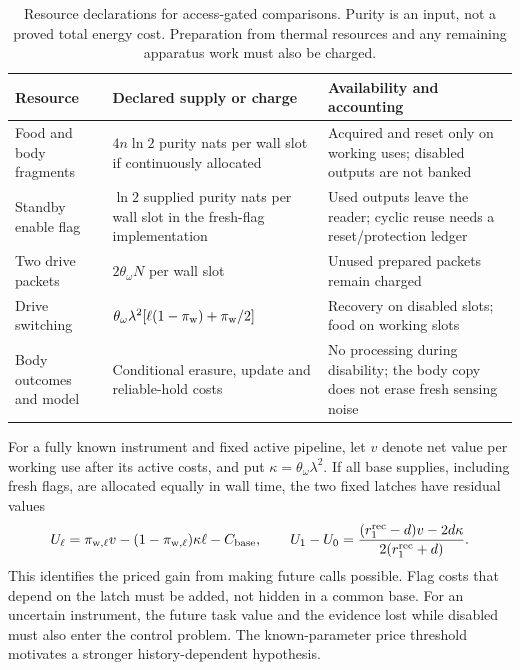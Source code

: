 \documentclass[12pt]{article}
\theoremstyle{definition}
\begin{document}
\begin{table}[ht]
\centering\small
\begin{tabular}{@{}P{3.2cm}P{4.6cm}P{4.7cm}@{}}
\toprule
Resource & Declared supply or charge & Availability and accounting\\
\midrule
Food and body fragments & $4n\ln2$ purity nats per wall slot if continuously allocated & Acquired and reset only on working uses; disabled outputs are not banked\\[3pt]
Standby enable flag & $\ln2$ supplied purity nats per wall slot in the fresh-flag implementation & Used outputs leave the reader; cyclic reuse needs a reset/protection ledger\\[3pt]
Two drive packets & $2\theta_\omega N$ per wall slot & Unused prepared packets remain charged\\[3pt]
Drive switching & $\theta_\omega\lambda^2[\ell(1-\pi_{\rm w})+\pi_{\rm w}/2]$ & Recovery on disabled slots; food on working slots\\[3pt]
Body outcomes and model & Conditional erasure, update and reliable-hold costs & No processing during disability; the body copy does not erase fresh sensing noise\\
\bottomrule
\end{tabular}
\caption{Resource declarations for access-gated comparisons. Purity is an input, not a proved total energy cost. Preparation from thermal resources and any remaining apparatus work must also be charged.}
\label{tab:body_access_ledger}
\end{table}

For a fully known instrument and fixed active pipeline, let $v$ denote net value per working use after its active costs, and put $\kappa=\theta_\omega\lambda^2$. If all base supplies, including fresh flags, are allocated equally in wall time, the two fixed latches have residual values
\[
 U_\ell=\pi_{{\rm w},\ell}v-(1-\pi_{{\rm w},\ell})\kappa\ell-C_{\rm base},
 \qquad U_1-U_0=\frac{(r_1^{\rm rec}-d)v-2d\kappa}{2(r_1^{\rm rec}+d)}.
\]
This identifies the priced gain from making future calls possible. Flag costs that depend on the latch must be added, not hidden in a common base. For an uncertain instrument, the future task value and the evidence lost while disabled must also enter the control problem. The known-parameter price threshold motivates a stronger history-dependent hypothesis.
\end{document}
